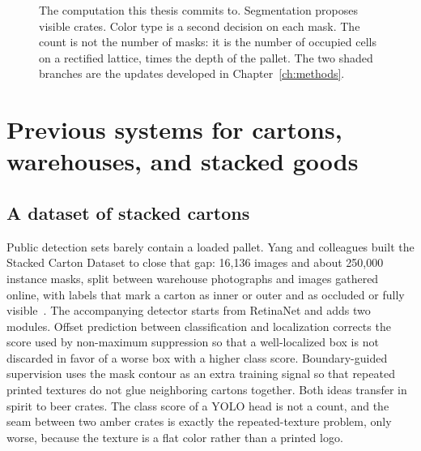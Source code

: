 \begin{figure}[t]
\centering
{}
\caption{The computation this thesis commits to. Segmentation proposes visible crates. Color type is a second decision on each mask. The count is not the number of masks: it is the number of occupied cells on a rectified lattice, times the depth of the pallet. The two shaded branches are the updates developed in Chapter~\ref{ch:methods}.}
\label{fig:pipeline-overview}
\end{figure}

\section{Previous systems for cartons, warehouses, and stacked goods}
\label{sec:prior-systems}

\subsection{A dataset of stacked cartons}
\label{sec:scd}

Public detection sets barely contain a loaded pallet. Yang and colleagues built the Stacked Carton Dataset to close that gap: 16{,}136 images and about 250{,}000 instance masks, split between warehouse photographs and images gathered online, with labels that mark a carton as inner or outer and as occluded or fully visible~\cite{yang2022scd}. The accompanying detector starts from RetinaNet and adds two modules. Offset prediction between classification and localization corrects the score used by non-maximum suppression so that a well-localized box is not discarded in favor of a worse box with a higher class score. Boundary-guided supervision uses the mask contour as an extra training signal so that repeated printed textures do not glue neighboring cartons together. Both ideas transfer in spirit to beer crates. The class score of a YOLO head is not a count, and the seam between two amber crates is exactly the repeated-texture problem, only worse, because the texture is a flat color rather than a printed logo.

